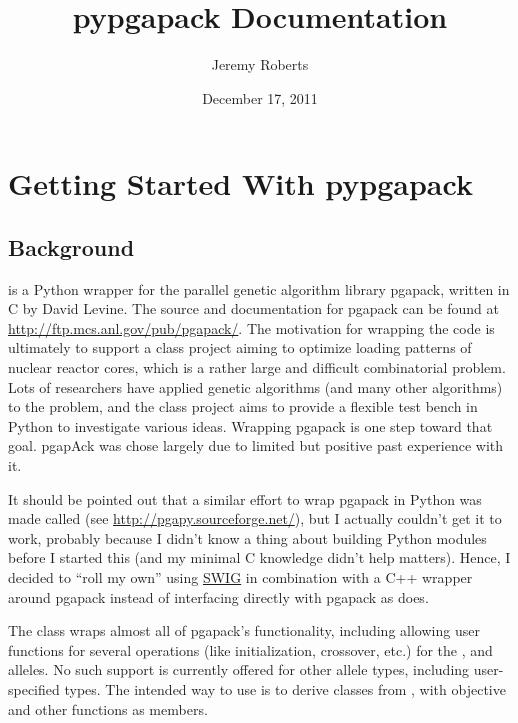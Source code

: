 \documentclass[letterpaper,11pt,english]{sphinxmanual}
\title{pypgapack Documentation}
\date{December 17, 2011}
\author{Jeremy Roberts}
\begin{document}
\maketitle
\tableofcontents
{}\label{index::doc}



\chapter{Getting Started With pypgapack}
\label{getting_started::doc}\label{getting_started:getting-started-with-pypgapack}\label{getting_started:pypgapack-a-light-python-wrapper-for-pgapack}\label{getting_started:sec-getting-started}

\section{Background}
\label{getting_started:background}
 is a Python wrapper for the parallel genetic
algorithm library pgapack, written in C by David Levine.
The source and documentation for pgapack can be found at
\href{http://ftp.mcs.anl.gov/pub/pgapack/}{http://ftp.mcs.anl.gov/pub/pgapack/}.
The motivation for wrapping the code is ultimately to support
a class project aiming to optimize loading patterns of
nuclear reactor cores, which is a rather large and difficult
combinatorial problem.  Lots of researchers have applied genetic algorithms
(and many other algorithms) to the problem, and the class project
aims to provide a flexible test bench in Python to investigate
various ideas.  Wrapping pgapack is one step toward that goal.
pgapAck was chose largely due to limited but positive past
experience with it.

It should be pointed out that a similar effort to wrap pgapack
in Python was made called  (see \href{http://pgapy.sourceforge.net/}{http://pgapy.sourceforge.net/}), but I actually couldn't get it
to work, probably because I didn't know a thing about building
Python modules before I started this (and my minimal C knowledge
didn't help matters).  Hence, I decided to ``roll my own'' using
\href{http://www.swig.org/}{SWIG} in combination with a C++ wrapper
around pgapack instead of interfacing directly with pgapack
as  does.

The {\hyperref[api_reference:PGA]{}} class wraps almost all of pgapack's functionality,
including allowing user functions for several operations (like
initialization, crossover, etc.) for the ,
 and  alleles.
No such support is currently offered for other allele types,
including user-specified types.  The intended way to use
 is to derive classes from {\hyperref[api_reference:PGA]{}}, with
objective and other functions as members.
\end{document}
